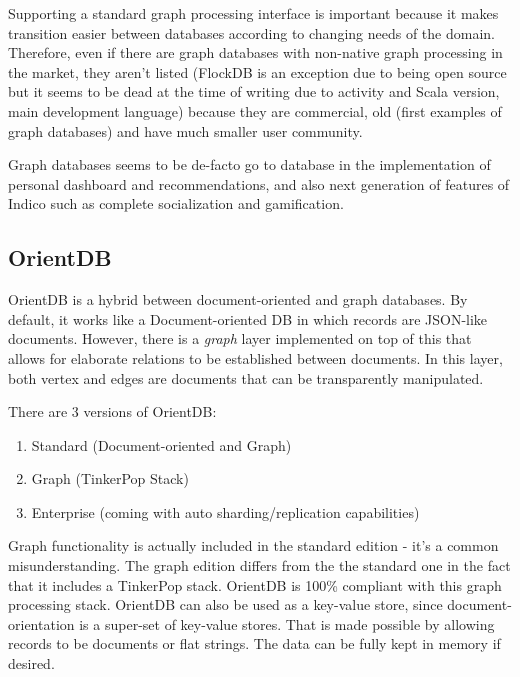 Supporting a standard graph processing interface is important because it makes transition easier between databases according to changing needs of the domain. Therefore, even if there are graph databases with non-native graph processing in the market, they aren't listed (FlockDB is an exception due to being open source but it seems to be dead at the time of writing due to activity and Scala version, main development language) because they are commercial, old (first examples of graph databases) and have much smaller user community.

Graph databases seems to be de-facto go to database in the implementation of personal dashboard and recommendations, and also next generation of features of Indico such as complete socialization and gamification.

\subsection{OrientDB}

OrientDB is a hybrid between document-oriented and graph databases. By default, it works like a Document-oriented DB in which records are JSON-like documents. However, there is a \textit{graph} layer implemented on top of this that allows for elaborate relations to be established between documents. In this layer, both vertex and edges are documents that can be transparently manipulated.

There are 3 versions of OrientDB: 
\begin{enumerate}
  \item Standard (Document-oriented and Graph)
  \item Graph (TinkerPop Stack)
  \item Enterprise (coming with auto sharding/replication capabilities)
\end{enumerate}

Graph functionality is actually included in the standard edition - it's a common misunderstanding. The graph edition differs from the the standard one in the fact that it includes a TinkerPop stack. OrientDB is 100\% compliant with this graph processing stack. OrientDB can also be used as a key-value store, since document-orientation is a super-set of key-value stores. That is made possible by allowing records to be documents or flat strings. The data can be fully kept in memory if desired.

